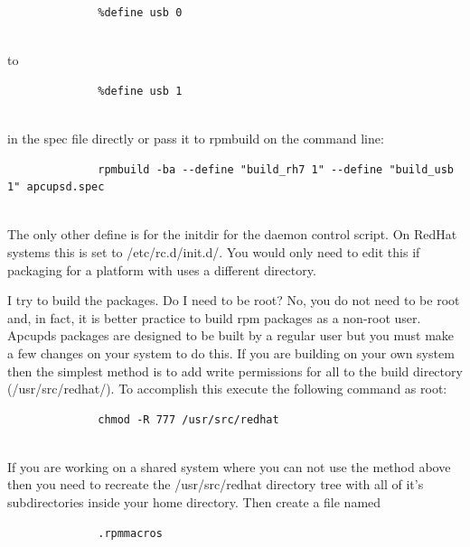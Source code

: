{{{{{{{{{{{{{{{\begin{description}
\footnotesize
\begin{verbatim}
              %define usb 0
     
\end{verbatim}
\normalsize

to  

\footnotesize
\begin{verbatim}
              %define usb 1
     
\end{verbatim}
\normalsize

in the spec file directly or pass it to rpmbuild on the command line:  

\footnotesize
\begin{verbatim}
              rpmbuild -ba --define "build_rh7 1" --define "build_usb 1" apcupsd.spec
     
\end{verbatim}
\normalsize


\item [{\bf other defines are used?}]
   The only other define is for the initdir for the daemon control script. On
RedHat systems this is set to /etc/rc.d/init.d/.  You would only need to edit
this if packaging for a platform with uses a different directory.  

\item [{\bf I'm getting errors about not having permission when}]
   I try to build the packages.  Do I need to be root? No, you do not need to be
root and, in fact, it is better practice to build rpm packages as a non-root
user.  Apcupds packages are designed to be built by a regular user but you
must make a few changes on your system to do this.  If you are building on
your own system then the simplest method is to add write permissions for all
to the build directory (/usr/src/redhat/).  To accomplish this execute the
following command as root:  

\footnotesize
\begin{verbatim}
              chmod -R 777 /usr/src/redhat
     
\end{verbatim}
\normalsize

If you are working on a shared system where you can not use the method above
then you need to recreate the /usr/src/redhat directory tree with all of it's
subdirectories inside your home directory. Then create a file named  

\footnotesize
\begin{verbatim}
              .rpmmacros
     

\end{verbatim}
\end{description}}}}}}}}}}}}}}}}
